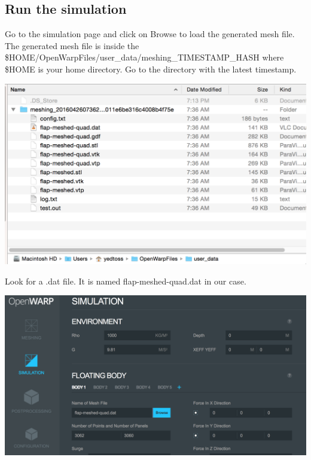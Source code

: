 \documentclass[12pt]{article}
\begin{document}
\subsection{Run the simulation}

Go to the simulation page and click on Browse to load the generated mesh file.
The generated mesh file is inside the \$HOME/OpenWarpFiles/user{\_}data/meshing_TIMESTAMP_HASH where
\$HOME is your home directory. Go to the directory with the latest timestamp.

\vspace{\abovedisplayskip}
\begin{minipage}{\linewidth}
	\centering
	\includegraphics[scale=0.5]{img/47}
\end{minipage}
\vspace{\belowdisplayskip}

Look for a .dat file. It is named flap-meshed-quad.dat in our case.

\vspace{\abovedisplayskip}
\begin{minipage}{\linewidth}
	\centering
	\includegraphics[scale=0.5]{img/48}
\end{minipage}
\vspace{\belowdisplayskip}
\end{document}
